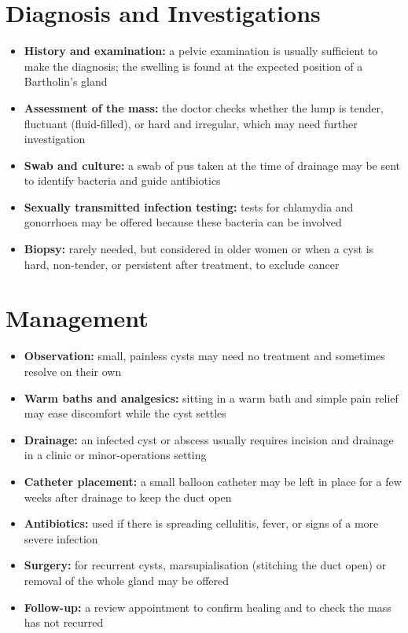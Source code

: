\section*{Diagnosis and Investigations}
\begin{itemize}
    \item \textbf{History and examination:} a pelvic examination is usually sufficient to make the diagnosis; the swelling is found at the expected position of a Bartholin's gland
    \item \textbf{Assessment of the mass:} the doctor checks whether the lump is tender, fluctuant (fluid-filled), or hard and irregular, which may need further investigation
    \item \textbf{Swab and culture:} a swab of pus taken at the time of drainage may be sent to identify bacteria and guide antibiotics
    \item \textbf{Sexually transmitted infection testing:} tests for chlamydia and gonorrhoea may be offered because these bacteria can be involved
    \item \textbf{Biopsy:} rarely needed, but considered in older women or when a cyst is hard, non-tender, or persistent after treatment, to exclude cancer
\end{itemize}

\section*{Management}
\begin{itemize}
    \item \textbf{Observation:} small, painless cysts may need no treatment and sometimes resolve on their own
    \item \textbf{Warm baths and analgesics:} sitting in a warm bath and simple pain relief may ease discomfort while the cyst settles
    \item \textbf{Drainage:} an infected cyst or abscess usually requires incision and drainage in a clinic or minor-operations setting
    \item \textbf{Catheter placement:} a small balloon catheter may be left in place for a few weeks after drainage to keep the duct open
    \item \textbf{Antibiotics:} used if there is spreading cellulitis, fever, or signs of a more severe infection
    \item \textbf{Surgery:} for recurrent cysts, marsupialisation (stitching the duct open) or removal of the whole gland may be offered
    \item \textbf{Follow-up:} a review appointment to confirm healing and to check the mass has not recurred
\end{itemize}

